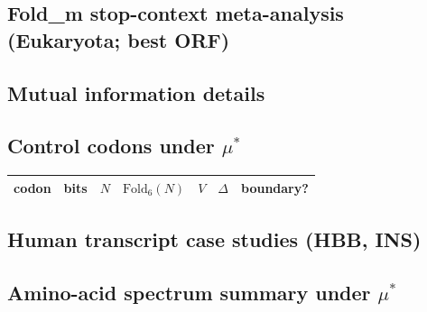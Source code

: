 \medskip

\noindent

\subsection{Fold\_m stop-context meta-analysis (Eukaryota; best ORF)}
\label{app:foldm_stop_context_meta_eukaryota}

\noindent

\subsection{Mutual information details}



\subsection{Control codons under \texorpdfstring{$\mu^\ast$}{mu*}}

\begin{center}
\small
\setlength{\tabcolsep}{6pt}
\renewcommand{\arraystretch}{1.15}
\begin{tabular}{llllrrl}
\toprule
codon & bits & $N$ & $\mathrm{Fold}_6(N)$ & $V$ & $\Delta$ & boundary? \\
\midrule

\end{tabular}
\end{center}

\subsection{Human transcript case studies (HBB, INS)}

\begin{center}
\scriptsize
\setlength{\tabcolsep}{4pt}
\renewcommand{\arraystretch}{1.15}
\end{center}

\subsection{Amino-acid spectrum summary under \texorpdfstring{$\mu^\ast$}{mu*}}

